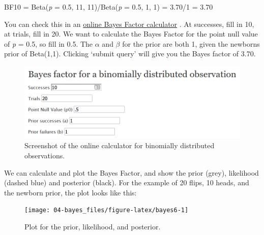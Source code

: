 \documentclass[
  oneside]{krantz}
\begin{document}
BF10 = Beta(\emph{p} = 0.5, 11, 11)/Beta(\emph{p} = 0.5, 1, 1) = 3.70/1 = 3.70

You can check this in an \href{http://pcl.missouri.edu/bf-binomial}{online Bayes Factor calculator} \citep{rouder_bayesian_2009}. At successes, fill in 10, at trials, fill in 20. We want to calculate the Bayes Factor for the point null value of \emph{p} = 0.5, so fill in 0.5. The \(\alpha\) and \(\beta\) for the prior are both 1, given the newborns prior of Beta(1,1). Clicking `submit query' will give you the Bayes factor of 3.70.



\begin{figure}

{\centering \includegraphics[width=1\linewidth]{images/binombayesonline} 

}

\caption{Screenshot of the online calculator for binomially distributed observations.}\label{fig:gpower-screenshot-bayes}
\end{figure}

We can calculate and plot the Bayes Factor, and show the prior (grey), likelihood (dashed blue) and posterior (black). For the example of 20 flips, 10 heads, and the newborn prior, the plot looks like this:



\begin{figure}

{\centering \texttt{[image: 04-bayes\_files/figure-latex/bayes6-1]} 

}

\caption{Plot for the prior, likelihood, and posterior.}\label{fig:bayes6}
\end{figure}
\end{document}
